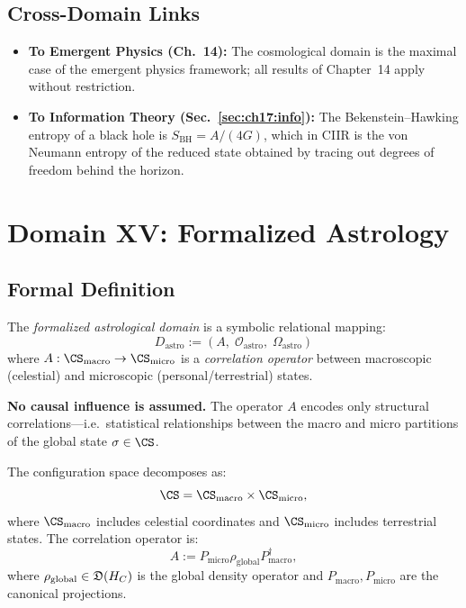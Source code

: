 \subsection{Cross-Domain Links}

\begin{itemize}
  \item \textbf{To Emergent Physics (Ch.~14):} The cosmological domain
        is the maximal case of the emergent physics framework; all
        results of Chapter~14 apply without restriction.
  \item \textbf{To Information Theory (Sec.~\ref{sec:ch17:info}):}
        The Bekenstein--Hawking entropy of a black hole is
        $S_{\mathrm{BH}} = A / (4 G)$, which in CIIR is the von
        Neumann entropy of the reduced state obtained by tracing
        out degrees of freedom behind the horizon.
\end{itemize}

\section{Domain XV: Formalized Astrology}
\label{sec:ch19:astrology}

\subsection{Formal Definition}

\begin{definition}\label{def:19.3}
The \emph{formalized astrological domain} is a symbolic relational
mapping:
\[
  D_{\mathrm{astro}} := (A,\; \mathcal{O}_{\mathrm{astro}},\;
                         \Omega_{\mathrm{astro}})
\]
where $A : \CS_{\mathrm{macro}} \to \CS_{\mathrm{micro}}$ is a
\emph{correlation operator} between macroscopic (celestial) and
microscopic (personal/terrestrial) states.

\textbf{No causal influence is assumed.}  The operator $A$ encodes
only structural correlations—i.e.\ statistical relationships between
the macro and micro partitions of the global state $\sigma \in \CS$.
\end{definition}

\begin{definition}\label{def:19.4}
The configuration space decomposes as:
\[
  \CS = \CS_{\mathrm{macro}} \times \CS_{\mathrm{micro}},
\]
where $\CS_{\mathrm{macro}}$ includes celestial coordinates and
$\CS_{\mathrm{micro}}$ includes terrestrial states.  The correlation
operator is:
\[
  A := P_{\mathrm{micro}} \rho_{\mathrm{global}} P_{\mathrm{macro}}^\dagger,
\]
where $\rho_{\mathrm{global}} \in \mathfrak{D}(H_C)$ is the global
density operator and $P_{\mathrm{macro}}, P_{\mathrm{micro}}$ are
the canonical projections.
\end{definition}

